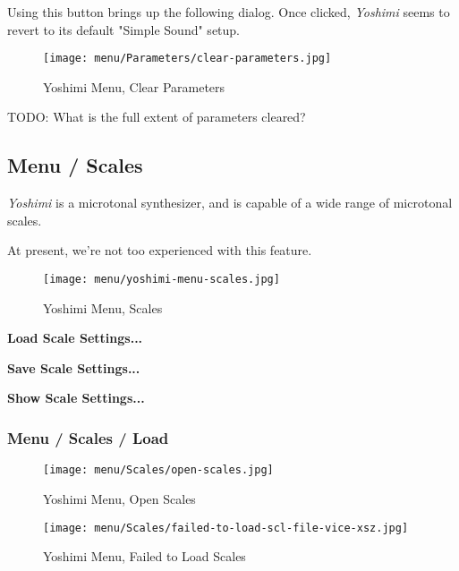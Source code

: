    Using this button brings up the following dialog.  Once clicked,
   \textsl{Yoshimi} seems to revert to its default "Simple Sound" setup.

\begin{figure}[H]
   \centering 
   \texttt{[image: menu/Parameters/clear-parameters.jpg]}
   \caption{Yoshimi Menu, Clear Parameters}
   \label{fig:yoshimi_menu_clear_parameters}
\end{figure}

   TODO:  What is the full extent of parameters cleared?

\subsection{Menu / Scales}
\label{subsec:menu_scales}

   \textsl{Yoshimi} is a microtonal synthesizer, and is capable of a wide
   range of microtonal scales.

   At present, we're not too experienced with this feature.

\begin{figure}[H]
   \centering 
   \texttt{[image: menu/yoshimi-menu-scales.jpg]}
   \caption{Yoshimi Menu, Scales}
   \label{fig:yoshimi_menu_scales}
\end{figure}

   \begin{enumber}
      \item \textbf{Load Scale Settings...}
      \item \textbf{Save Scale Settings...}
      \item \textbf{Show Scale Settings...}
   \end{enumber}

\subsubsection{Menu / Scales / Load}
\label{subsec:menu_scales_load}

\begin{figure}[H]
   \centering 
   \texttt{[image: menu/Scales/open-scales.jpg]}
   \caption{Yoshimi Menu, Open Scales}
   \label{fig:yoshimi_menu_open_scales}
\end{figure}

\begin{figure}[H]
   \centering 
   \texttt{[image: menu/Scales/failed-to-load-scl-file-vice-xsz.jpg]}
   \caption{Yoshimi Menu, Failed to Load Scales}
   \label{fig:yoshimi_menu_failed_to_load_scales}
\end{figure}

